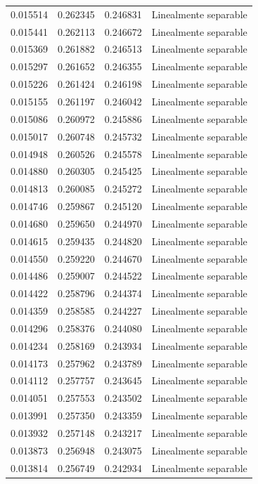 \begin{tabular}{llll}
0.015514 & 0.262345 & 0.246831 & Linealmente separable \\
0.015441 & 0.262113 & 0.246672 & Linealmente separable \\
0.015369 & 0.261882 & 0.246513 & Linealmente separable \\
0.015297 & 0.261652 & 0.246355 & Linealmente separable \\
0.015226 & 0.261424 & 0.246198 & Linealmente separable \\
0.015155 & 0.261197 & 0.246042 & Linealmente separable \\
0.015086 & 0.260972 & 0.245886 & Linealmente separable \\
0.015017 & 0.260748 & 0.245732 & Linealmente separable \\
0.014948 & 0.260526 & 0.245578 & Linealmente separable \\
0.014880 & 0.260305 & 0.245425 & Linealmente separable \\
0.014813 & 0.260085 & 0.245272 & Linealmente separable \\
0.014746 & 0.259867 & 0.245120 & Linealmente separable \\
0.014680 & 0.259650 & 0.244970 & Linealmente separable \\
0.014615 & 0.259435 & 0.244820 & Linealmente separable \\
0.014550 & 0.259220 & 0.244670 & Linealmente separable \\
0.014486 & 0.259007 & 0.244522 & Linealmente separable \\
0.014422 & 0.258796 & 0.244374 & Linealmente separable \\
0.014359 & 0.258585 & 0.244227 & Linealmente separable \\
0.014296 & 0.258376 & 0.244080 & Linealmente separable \\
0.014234 & 0.258169 & 0.243934 & Linealmente separable \\
0.014173 & 0.257962 & 0.243789 & Linealmente separable \\
0.014112 & 0.257757 & 0.243645 & Linealmente separable \\
0.014051 & 0.257553 & 0.243502 & Linealmente separable \\
0.013991 & 0.257350 & 0.243359 & Linealmente separable \\
0.013932 & 0.257148 & 0.243217 & Linealmente separable \\
0.013873 & 0.256948 & 0.243075 & Linealmente separable \\
0.013814 & 0.256749 & 0.242934 & Linealmente separable \\

\end{tabular}
